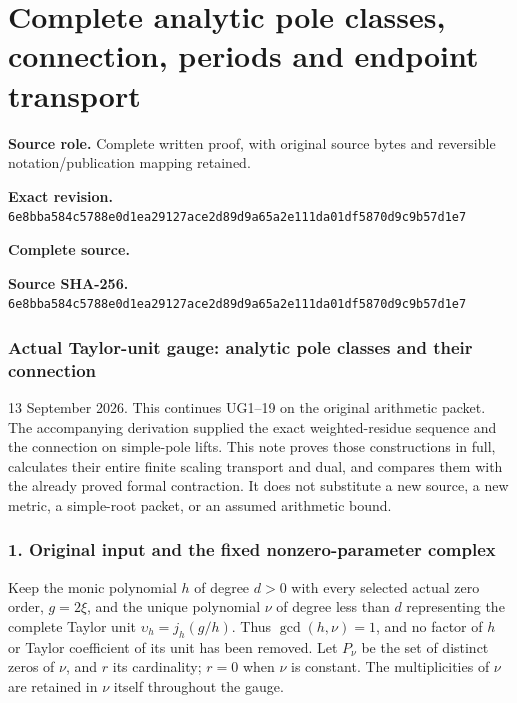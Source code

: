 \begingroup

\section{Complete analytic pole classes, connection, periods and endpoint transport}


\begingroup
\sloppy
\small

\noindent\textbf{Source role.} Complete written proof, with original source bytes and reversible notation/publication mapping retained.\par
\noindent\textbf{Exact revision.} \nolinkurl{6e8bba584c5788e0d1ea29127ace2d89d9a65a2e111da01df5870d9c9b57d1e7}\par
\noindent\textbf{Complete source.} \par
\noindent\textbf{Source SHA-256.} \nolinkurl{6e8bba584c5788e0d1ea29127ace2d89d9a65a2e111da01df5870d9c9b57d1e7}\par\medskip
\subsubsection{Actual Taylor-unit gauge: analytic pole classes and their connection}\label{endpoint-analytic_pole--actual-taylor-unit-gauge-analytic-pole-classes-and-their-connection}

13 September 2026. This continues UG1--19 on the original arithmetic packet. The accompanying derivation supplied the exact weighted-residue sequence and the connection on simple-pole lifts. This note proves those constructions in full, calculates their entire finite scaling transport and dual, and compares them with the already proved formal contraction. It does not substitute a new source, a new metric, a simple-root packet, or an assumed arithmetic bound.

\subsubsection{1. Original input and the fixed nonzero-parameter complex}\label{endpoint-analytic_pole--original-input-and-the-fixed-nonzero-parameter-complex}

Keep the monic polynomial \(h\) of degree \(d>0\) with every selected actual zero order, \(g=2\xi\), and the unique polynomial \(\nu\) of degree less than \(d\) representing the complete Taylor unit \(\upsilon_h=j_h(g/h)\). Thus \(\gcd(h,\nu)=1\), and no factor of \(h\) or Taylor coefficient of its unit has been removed. Let \(P_{\nu}\) be the set of distinct zeros of \(\nu\), and \(r\) its cardinality; \(r=0\) when \(\nu\) is constant. The multiplicities of \(\nu\) are retained in \(\nu\) itself throughout the gauge.


